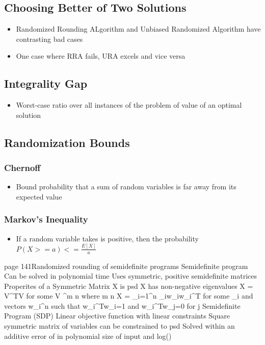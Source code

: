 \subsection{Choosing Better of Two Solutions}
\begin{itemize}
	\item Randomized Rounding ALgorithm and Unbiased Randomized Algorithm have contrasting bad cases
	\item One case where RRA fails, URA excels and vice versa
\end{itemize}
\subsection{Integrality Gap}
\begin{itemize}
	\item Worst-case ratio over all instances of the problem of value of an optimal solution
\end{itemize}
\subsection{Randomization Bounds}
\subsubsection{Chernoff}
\begin{itemize}
	\item Bound probability that a sum of random variables is far away from its expected value
\end{itemize}
\subsubsection{Markov's Inequality}
\begin{itemize}
	\item If a random variable takes is positive, then the probability $P(X >= a) <= \frac{E[X]}{a}$
\end{itemize}



	page 141Randomized rounding of semidefinite programs
	Semidefinite program
		Can be solved in polynomial time
		Uses symmetric, positive semidefinite matrices
	Properites of a Symmetric Matrix
		X is psd
		X has non-negative eigenvalues
		X = V^{T}V for some V \in \doubleR^{m \times n} where m \leq n
		X = \sum_{i=1}^{n} \lambda_{i}w_{i}w_{i}^{T} for some \lambda_{i}  and vectors w_{i}\in \doubleR^{n} such that w_{i}^{T}w_{i}=1 and w_{i}^{T}w_{j}=0 for \neq j
	Semidefinite Program (SDP)
		Linear objective function with linear constraints
		Square symmetric matrix of variables can be constrained to psd
		Solved within an additive error of \epsilon in polynomial size of input and log()


